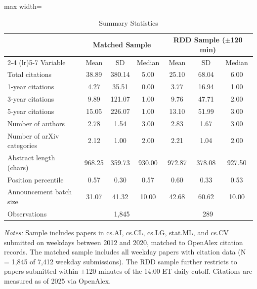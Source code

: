 \begin{table}[htbp]
\centering
\caption{Summary Statistics}
\label{tab:summary}
\begin{adjustbox}{max width=\textwidth}
\begin{tabular}{lcccccc}
\hline\hline
& \multicolumn{3}{c}{Matched Sample} & \multicolumn{3}{c}{RDD Sample ($\pm$120 min)} \\
\cmidrule(lr){2-4} \cmidrule(lr){5-7}
Variable & Mean & SD & Median & Mean & SD & Median \\
\hline
Total citations & 38.89 & 380.14 & 5.00 & 25.10 & 68.04 & 6.00 \\
1-year citations & 4.27 & 35.51 & 0.00 & 3.77 & 16.94 & 1.00 \\
3-year citations & 9.89 & 121.07 & 1.00 & 9.76 & 47.71 & 2.00 \\
5-year citations & 15.05 & 226.07 & 1.00 & 13.10 & 51.99 & 3.00 \\
Number of authors & 2.78 & 1.54 & 3.00 & 2.83 & 1.67 & 3.00 \\
Number of arXiv categories & 2.12 & 1.00 & 2.00 & 2.21 & 1.04 & 2.00 \\
Abstract length (chars) & 968.25 & 359.73 & 930.00 & 972.87 & 378.08 & 927.50 \\
Position percentile & 0.57 & 0.30 & 0.57 & 0.60 & 0.33 & 0.53 \\
Announcement batch size & 31.07 & 41.32 & 10.00 & 42.68 & 60.62 & 10.00 \\
\hline
Observations & \multicolumn{3}{c}{1,845} & \multicolumn{3}{c}{289} \\
\hline\hline
\end{tabular}
\end{adjustbox}
\begin{minipage}{0.95\textwidth}
\footnotesize
\textit{Notes:} Sample includes papers in cs.AI, cs.CL, cs.LG, stat.ML, and cs.CV submitted on weekdays between 2012 and 2020, matched to OpenAlex citation records. The matched sample includes all weekday papers with citation data (N = 1,845 of 7,412 weekday submissions). The RDD sample further restricts to papers submitted within $\pm$120 minutes of the 14:00 ET daily cutoff. Citations are measured as of 2025 via OpenAlex.
\end{minipage}
\end{table}
